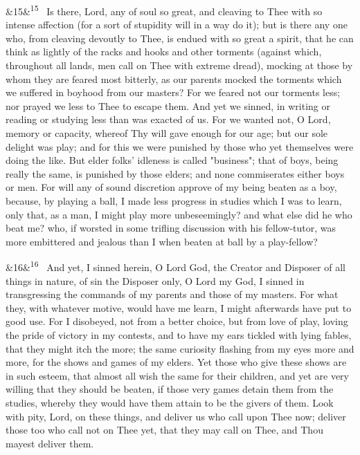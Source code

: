\documentclass[12pt]{article}
\newcommand{\para}[1][]{\par\noindent\ifx&#1&\else\textsuperscript{\footnotesize #1}~\fi}
\begin{document}
\para[15] Is there, Lord, any of soul so great, and cleaving to Thee with so intense affection (for a sort of stupidity will in a way do it); but is there any one who, from cleaving devoutly to Thee, is endued with so great a spirit, that he can think as lightly of the racks and hooks and other torments (against which, throughout all lands, men call on Thee with extreme dread), mocking at those by whom they are feared most bitterly, as our parents mocked the torments which we suffered in boyhood from our masters? For we feared not our torments less; nor prayed we less to Thee to escape them. And yet we sinned, in writing or reading or studying less than was exacted of us. For we wanted not, O Lord, memory or capacity, whereof Thy will gave enough for our age; but our sole delight was play; and for this we were punished by those who yet themselves were doing the like. But elder folks' idleness is called "business"; that of boys, being really the same, is punished by those elders; and none commiserates either boys or men. For will any of sound discretion approve of my being beaten as a boy, because, by playing a ball, I made less progress in studies which I was to learn, only that, as a man, I might play more unbeseemingly? and what else did he who beat me? who, if worsted in some trifling discussion with his fellow-tutor, was more embittered and jealous than I when beaten at ball by a play-fellow?

\para[16] And yet, I sinned herein, O Lord God, the Creator and Disposer of all things in nature, of sin the Disposer only, O Lord my God, I sinned in transgressing the commands of my parents and those of my masters. For what they, with whatever motive, would have me learn, I might afterwards have put to good use. For I disobeyed, not from a better choice, but from love of play, loving the pride of victory in my contests, and to have my ears tickled with lying fables, that they might itch the more; the same curiosity flashing from my eyes more and more, for the shows and games of my elders. Yet those who give these shows are in such esteem, that almost all wish the same for their children, and yet are very willing that they should be beaten, if those very games detain them from the studies, whereby they would have them attain to be the givers of them. Look with pity, Lord, on these things, and deliver us who call upon Thee now; deliver those too who call not on Thee yet, that they may call on Thee, and Thou mayest deliver them.
\end{document}
